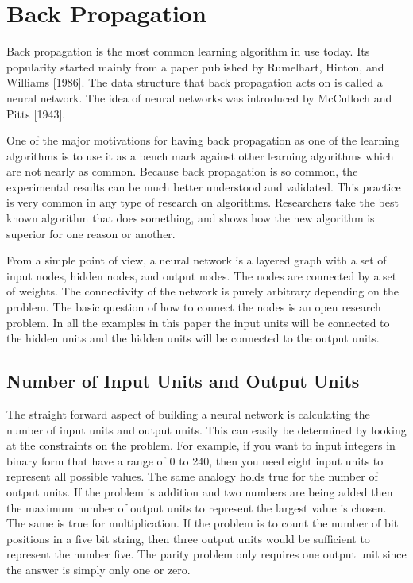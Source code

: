 \parskip 0.20in
\textheight 8.75in
\textwidth 6.0in
\topmargin -0.25in
\oddsidemargin 0.40in


\baselineskip 0.30in

\setcounter{chapter}{1}
\setcounter{page}{4}
\chapter{Back Propagation}	


	Back propagation is the most common learning algorithm in use
today.  Its popularity started mainly from a paper published by
Rumelhart, Hinton, and Williams [1986].  The data structure that back
propagation acts on is called a neural network.  The idea of neural
networks was introduced by McCulloch and Pitts [1943].

	One of the major motivations for having back propagation as
one of the learning algorithms is to use it as a bench mark against
other learning algorithms which are not nearly as common.  Because
back propagation is so common, the experimental results can be much
better understood and validated.  This practice is very common in any
type of research on algorithms.  Researchers take the best known
algorithm that does something, and shows how the new algorithm is
superior for one reason or another.

	From a simple point of view, a neural network is a layered
graph with a set of input nodes, hidden nodes, and output nodes.  The
nodes are connected by a set of weights.  The connectivity of the
network is purely arbitrary depending on the problem.  The basic
question of how to connect the nodes is an open research problem.  In
all the examples in this paper the input units will be connected to
the hidden units and the hidden units will be connected to the output
units.

\section{Number of Input Units and Output Units}

	The straight forward aspect of building a neural network is
calculating the number of input units and output units.  This can
easily be determined by looking at the constraints on the problem.
For example, if you want to input integers in binary form that have a
range of 0 to 240, then you need eight input units to represent all
possible values.  The same analogy holds true for the number of output
units.  If the problem is addition and two numbers are being added
then the maximum number of output units to represent the largest value
is chosen.  The same is true for multiplication.  If the problem is to
count the number of bit positions in a five bit string, then three
output units would be sufficient to represent the number five.  The
parity problem only requires one output unit since the answer is
simply only one or zero.

